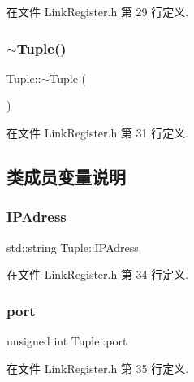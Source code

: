 在文件 Link\+Register.\+h 第 29 行定义.

\mbox{\label{class_tuple_ac25be2d63d4ca6755bcf8e699c413f27}} 
\subsubsection{\texorpdfstring{$\sim$\+Tuple()}{~Tuple()}}
{\footnotesize\ttfamily Tuple\+::$\sim$\+Tuple (\begin{DoxyParamCaption}{ }\end{DoxyParamCaption})\hspace{0.3cm}{\ttfamily [inline]}}



在文件 Link\+Register.\+h 第 31 行定义.



\subsection{类成员变量说明}
\mbox{\label{class_tuple_ab337a99a4e1461e69583204f91411236}} 
\subsubsection{\texorpdfstring{I\+P\+Adress}{IPAdress}}
{\footnotesize\ttfamily std\+::string Tuple\+::\+I\+P\+Adress}



在文件 Link\+Register.\+h 第 34 行定义.

\mbox{\label{class_tuple_aaf88caeb0b83349dcdb398babe704999}} 
\subsubsection{\texorpdfstring{port}{port}}
{\footnotesize\ttfamily unsigned int Tuple\+::port}



在文件 Link\+Register.\+h 第 35 行定义.

\mbox{\label{class_tuple_a600cae002bc27e9345905a600f0736ae}} 
